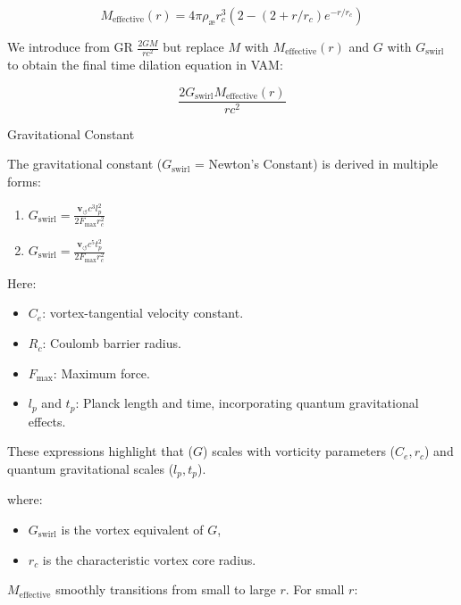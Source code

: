 \begin{equation*}
    M_\text{effective}(r) = 4\pi \rho_\text{\ae} r_c^3 \left( 2 - (2 + r/r_c) e^{-r / r_c} \right)
\end{equation*}


We introduce from GR $\frac{2 G M}{r c^2}$ but replace $M$ with $M_\text{effective}(r)$ and $G$ with $ G_\text{swirl}$ to obtain the final time dilation equation in VAM:

\begin{equation*}
\frac{2  G_\text{swirl} M_\text{effective}(r)}{r c^2}
\end{equation*}

Gravitational Constant

The gravitational constant ($ G_\text{swirl}$ = Newton's Constant) is derived in multiple forms:

\begin{enumerate}
\item $ G_\text{swirl} = \frac{\mathbf{v}_{\scriptscriptstyle\boldsymbol{\circlearrowleft}} c^3 l_p^2}{2 F_{\max} r_c^2}$
\item $ G_\text{swirl} = \frac{\mathbf{v}_{\scriptscriptstyle\boldsymbol{\circlearrowleft}} c^5 t_p^2}{2 F_{\max} r_c^2}$
\end{enumerate}

Here:

\begin{itemize}
\item $C_e$: vortex-tangential velocity constant.
\item $R_c$: Coulomb barrier radius.
\item $ F_{\max} $: Maximum force.
\item $l_p$ and $t_p$: Planck length and time, incorporating quantum gravitational effects.
\end{itemize}

These expressions highlight that ($G$) scales with vorticity parameters ($C_e, r_c$) and quantum gravitational scales ($l_p, t_p$).




where:

\begin{itemize}
    \item $ G_\text{swirl}$ is the vortex equivalent of $G$,
    \item $r_c$ is the characteristic vortex core radius.
\end{itemize}

$M_\text{effective}$ smoothly transitions from small to large $r$. For small $r$:

